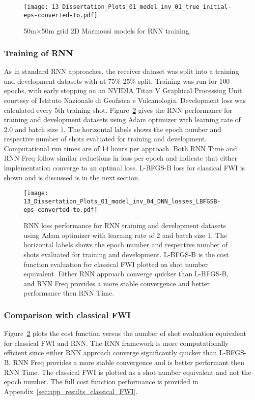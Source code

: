 \begin{figure}[ht!]
    \centering
    \texttt{[image: 13\_Dissertation\_Plots\_01\_model\_inv\_01\_true\_initial-eps-converted-to.pdf]}
    \caption[Synthetic 2D Marmousi models for RNN training.]{50\si{m}$\times$50\si{m} grid 2D Marmousi models for RNN training.}
    \label{fig:rnn_marm_models}
\end{figure}

\subsubsection{Training of RNN}
As in standard RNN approaches, the receiver dataset was split into a training and development datasets with at 75\%-25\% split. Training was run for 100 epochs, with early stopping on an NVIDIA Titan V Graphical Processing Unit courtesy of Istituto Nazionale di Geofisica e Vulcanologia. Development loss was calculated every 5th training shot. Figure~\ref{fig:rnn_losses} gives the RNN performance for training and development datasets using Adam optimizer with learning rate of 2.0 and batch size 1. The horizontal labels shows the epoch number and respective number of shots evaluated for training and development. Computational run times are of 14 hours per approach. Both RNN Time and RNN Freq follow similar reductions in loss per epoch and indicate that either implementation converge to an optimal loss. L-BFGS-B loss for classical FWI is shown and is discussed is in the next section.

\begin{figure}[ht!]
    \centering
    \texttt{[image: 13\_Dissertation\_Plots\_01\_model\_inv\_04\_DNN\_losses\_LBFGSB-eps-converted-to.pdf]}
    \caption[RNN loss performance.]{RNN loss performance for RNN training and development datasets using Adam optimizer with learning rate of 2 and batch size 1. The horizontal labels shows the epoch number and respective number of shots evaluated for training and development. L-BFGS-B is the cost function evaluation for classical FWI plotted on shot number equivalent. Either RNN approach converge quicker than L-BFGS-B, and RNN Freq provides a more stable convergence and better performance then RNN Time.}
    \label{fig:rnn_losses}
\end{figure}

\subsubsection{Comparison with classical FWI}\label{sec:results_rnn_comparison_to_FWI}
Figure~\ref{fig:rnn_losses} plots the cost function versus the number of shot evaluation equivalent for classical FWI and RNN. The RNN framework is more computationally efficient since either RNN approach converge significantly quicker than L-BFGS-B. RNN Freq provides a more stable convergence and is better performant then RNN Time. The classical FWI is plotted as a shot number equivalent and not the epoch number. The full cost function performance is provided in Appendix~\ref{sec:app_results_classical_FWI}. 

